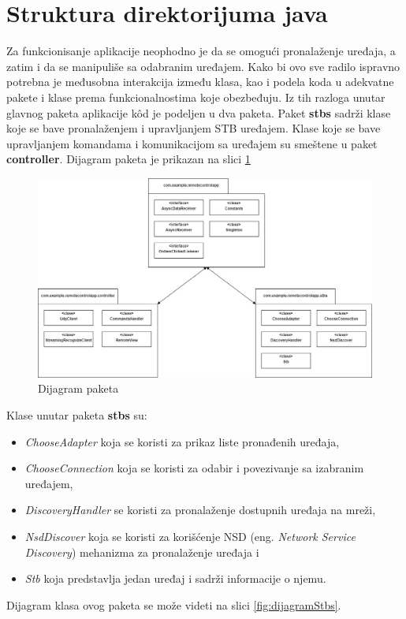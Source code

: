 \documentclass[implementacija.tex]{subfiles}
\begin{document}
\section{Struktura direktorijuma java}
Za funkcionisanje aplikacije neophodno je da se omogući pronalaženje uređaja, a zatim i da se manipuliše sa odabranim uređajem. Kako bi ovo sve radilo ispravno potrebna je međusobna interakcija između klasa, kao i podela koda u adekvatne pakete i klase prema funkcionalnostima koje obezbeđuju. Iz tih razloga unutar glavnog paketa aplikacije k\^{o}d je podeljen u dva paketa. Paket \textbf{stbs} sadrži klase koje se bave pronalaženjem i upravljanjem STB uređajem. Klase koje se bave upravljanjem komandama i komunikacijom sa uređajem su smeštene u paket \textbf{controller}.  Dijagram paketa je prikazan na slici \ref{fig:dijagramPaketa}


\begin{figure}[!ht]
  \centering
  \includegraphics[width=\textwidth]{Implementacija/dijagrami/pakage_diagram.jpg}
  \caption{Dijagram paketa}
  \label{fig:dijagramPaketa}
\end{figure}

Klase unutar paketa \textbf{stbs} su:
\begin{itemize}
\item \textit{ChooseAdapter} koja se koristi za prikaz liste pronađenih uređaja,
\item \textit{ChooseConnection} koja se koristi za odabir i povezivanje sa izabranim uređajem,
\item \textit{DiscoveryHandler} se koristi za pronalaženje dostupnih uređaja na mreži,
\item \textit{NsdDiscover} koja se koristi za korišćenje NSD (eng. \textit{Network Service Discovery}) mehanizma za pronalaženje uređaja i
\item \textit{Stb} koja predstavlja jedan uređaj i sadrži informacije o njemu.
\end{itemize}
Dijagram klasa ovog paketa se može videti na slici \ref{fig:dijagramStbs}.
\end{document}
